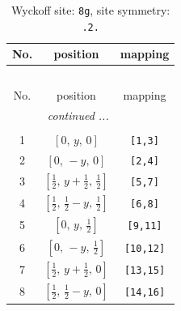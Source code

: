 \documentclass[fleqn,8pt]{jsarticle}
\begin{document}
\begin{longtable}{ccc}
\caption{Wyckoff site: {\tt 8g}, site symmetry: {\tt .2.}}
 \\
 \hline \hline
No. & position & mapping \\ \hline \endfirsthead

\multicolumn{2}{l}{\tablename\ \thetable{}} \\
 \hline \hline
No. & position & mapping \\ \hline \endhead

 \hline \hline
\multicolumn{2}{r}{\footnotesize\it continued ...} \\ \endfoot

 \hline \hline
\multicolumn{2}{r}{} \\ \endlastfoot

1 & $\left[ 0,\, y,\, 0 \right]$ & {\tt [1,3]} \\ \hline
2 & $\left[ 0,\, - y,\, 0 \right]$ & {\tt [2,4]} \\ \hline
3 & $\left[ \frac{1}{2},\, y + \frac{1}{2},\, \frac{1}{2} \right]$ & {\tt [5,7]} \\ \hline
4 & $\left[ \frac{1}{2},\, \frac{1}{2} - y,\, \frac{1}{2} \right]$ & {\tt [6,8]} \\ \hline
5 & $\left[ 0,\, y,\, \frac{1}{2} \right]$ & {\tt [9,11]} \\ \hline
6 & $\left[ 0,\, - y,\, \frac{1}{2} \right]$ & {\tt [10,12]} \\ \hline
7 & $\left[ \frac{1}{2},\, y + \frac{1}{2},\, 0 \right]$ & {\tt [13,15]} \\ \hline
8 & $\left[ \frac{1}{2},\, \frac{1}{2} - y,\, 0 \right]$ & {\tt [14,16]} \\
\end{longtable}
\renewcommand{\arraystretch}{1.2}
\end{document}
